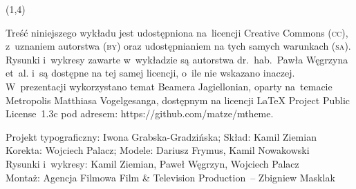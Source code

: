{\begin{frame}[standout]
\begin{textblock}{4.2}
    \end{textblock}





    \begin{textblock}{11}(1,4)

      \begin{flushleft}

        \mdseries

        \footnotesize

        \RaggedRight

        \color{jFrametitleFGColor}

        Treść niniejszego wykładu jest udostępniona na~licencji
        Creative Commons (\textsc{cc}), z~uzna\-niem autorstwa
        (\textsc{by}) oraz udostępnianiem na tych samych warunkach
        (\textsc{sa}). Rysunki i~wy\-kresy zawarte w~wykładzie są
        autorstwa dr.~hab.~Pawła Węgrzyna et~al. i~są dostępne
        na tej samej licencji, o~ile nie wskazano inaczej.
        W~prezentacji wykorzystano temat Beamera Jagiellonian,
        oparty na~temacie Metropolis Matthiasa Vogelgesanga,
        dostępnym na licencji \LaTeX{} Project Public License~1.3c
        pod adresem: 
        {https://github.com/matze/mtheme}.

        Projekt typograficzny: Iwona Grabska-Gradzińska;
        Skład: Kamil Ziemian \\
        Korekta: Wojciech Palacz;
        Modele: Dariusz Frymus, Kamil Nowakowski \\
        Rysunki i~wykresy: Kamil Ziemian, Paweł Węgrzyn, Wojciech Palacz \\
        Montaż: Agencja Filmowa Film \& Television Production~-- Zbigniew
        Masklak

      \end{flushleft}

    \end{textblock}

  \end{frame}
}





